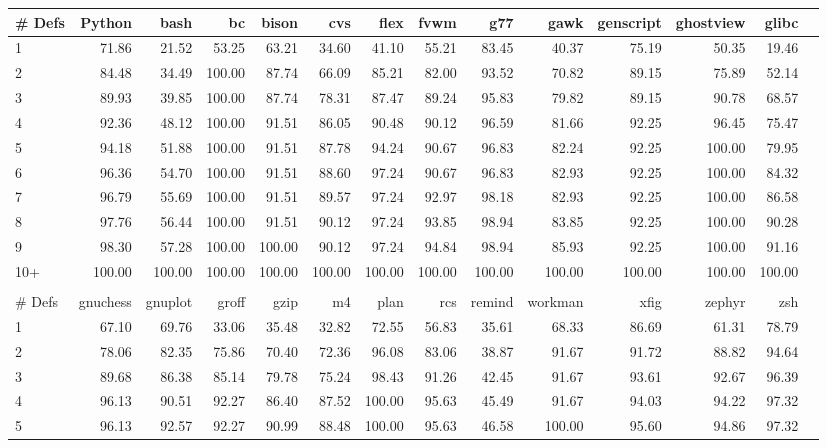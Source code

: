 \begin{tabular}{|l|r|r|r|r|r|r|r|r|r|r|r|r|r|}\hline
\# Defs & Python & bash & bc & bison & cvs & flex & fvwm & g77 & gawk & genscript & ghostview & glibc\\\hline\hline
1 & 71.86 & 21.52 & 53.25 & 63.21 & 34.60 & 41.10 & 55.21 & 83.45 & 40.37 & 75.19 & 50.35 & 19.46\\\hline
2 & 84.48 & 34.49 & 100.00 & 87.74 & 66.09 & 85.21 & 82.00 & 93.52 & 70.82 & 89.15 & 75.89 & 52.14\\\hline
3 & 89.93 & 39.85 & 100.00 & 87.74 & 78.31 & 87.47 & 89.24 & 95.83 & 79.82 & 89.15 & 90.78 & 68.57\\\hline
4 & 92.36 & 48.12 & 100.00 & 91.51 & 86.05 & 90.48 & 90.12 & 96.59 & 81.66 & 92.25 & 96.45 & 75.47\\\hline
5 & 94.18 & 51.88 & 100.00 & 91.51 & 87.78 & 94.24 & 90.67 & 96.83 & 82.24 & 92.25 & 100.00 & 79.95\\\hline
6 & 96.36 & 54.70 & 100.00 & 91.51 & 88.60 & 97.24 & 90.67 & 96.83 & 82.93 & 92.25 & 100.00 & 84.32\\\hline
7 & 96.79 & 55.69 & 100.00 & 91.51 & 89.57 & 97.24 & 92.97 & 98.18 & 82.93 & 92.25 & 100.00 & 86.58\\\hline
8 & 97.76 & 56.44 & 100.00 & 91.51 & 90.12 & 97.24 & 93.85 & 98.94 & 83.85 & 92.25 & 100.00 & 90.28\\\hline
9 & 98.30 & 57.28 & 100.00 & 100.00 & 90.12 & 97.24 & 94.84 & 98.94 & 85.93 & 92.25 & 100.00 & 91.16\\\hline
10+ & 100.00 & 100.00 & 100.00 & 100.00 & 100.00 & 100.00 & 100.00 & 100.00 & 100.00 & 100.00 & 100.00 & 100.00\\\hline
\multicolumn{12}{c}{} \\
\hline
\# Defs & gnuchess & gnuplot & groff & gzip & m4 & plan & rcs & remind & workman & xfig & zephyr & zsh\\\hline\hline
1 & 67.10 & 69.76 & 33.06 & 35.48 & 32.82 & 72.55 & 56.83 & 35.61 & 68.33 & 86.69 & 61.31 & 78.79\\\hline
2 & 78.06 & 82.35 & 75.86 & 70.40 & 72.36 & 96.08 & 83.06 & 38.87 & 91.67 & 91.72 & 88.82 & 94.64\\\hline
3 & 89.68 & 86.38 & 85.14 & 79.78 & 75.24 & 98.43 & 91.26 & 42.45 & 91.67 & 93.61 & 92.67 & 96.39\\\hline
4 & 96.13 & 90.51 & 92.27 & 86.40 & 87.52 & 100.00 & 95.63 & 45.49 & 91.67 & 94.03 & 94.22 & 97.32\\\hline
5 & 96.13 & 92.57 & 92.27 & 90.99 & 88.48 & 100.00 & 95.63 & 46.58 & 100.00 & 95.60 & 94.86 & 97.32\\\hline

\end{tabular}
